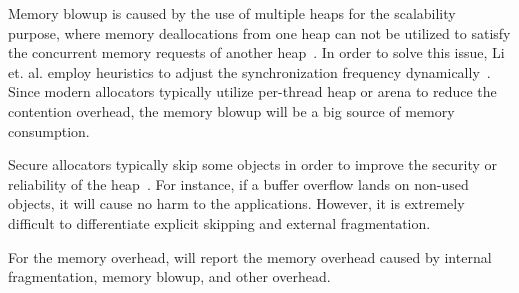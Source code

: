 Memory blowup is caused by the use of multiple heaps for the scalability purpose, where memory deallocations from one heap can not be utilized to satisfy the concurrent memory requests of another heap~\cite{Hoard}. In order to solve this issue, Li et. al. employ heuristics to adjust the synchronization frequency dynamically~\cite{DBLP:conf/iwmm/LiLD19}. Since modern allocators typically utilize per-thread heap or arena to reduce the contention overhead, the memory blowup will be a big source of memory consumption. 

Secure allocators typically skip some objects in order to improve the security or reliability of the heap~\cite{DieHarder, openbsd, Guarder}. For instance, if a buffer overflow lands on non-used objects, it will cause no harm to the applications. However, it is extremely difficult to differentiate explicit skipping and external fragmentation. 

For the memory overhead, \MP{} will report the memory overhead caused by internal fragmentation, memory blowup, and other overhead. 




